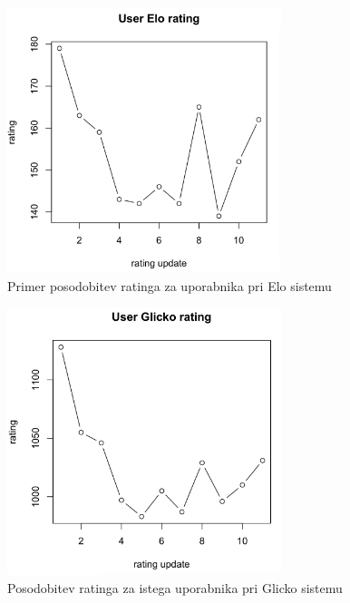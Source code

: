 \documentclass{IEEEtran}
\begin{document}
\newpage

\begin{figure}[h!]
    \includegraphics[width=8cm]{EloUserExample}
    \caption{Primer posodobitev ratinga za uporabnika pri Elo sistemu}%
    \label{fig:example}%
\end{figure}
\begin{figure}[h!]
    \includegraphics[width=8cm]{GlickoUserExample}
    \caption{Posodobitev ratinga za istega uporabnika pri Glicko sistemu}%
    \label{fig:example}%
\end{figure}
\end{document}

